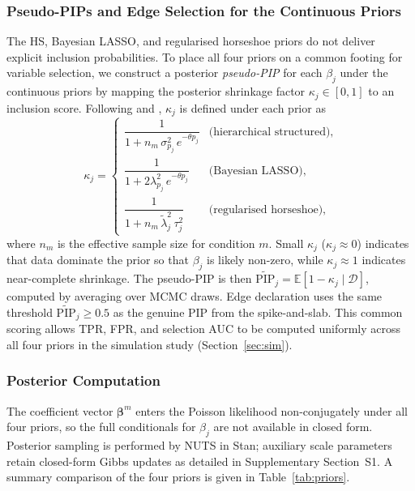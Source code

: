 \documentclass[12pt]{article}
\begin{document}
\subsubsection{Pseudo-PIPs and Edge Selection for the Continuous Priors}
\label{sec:pseudo_pip}

The HS, Bayesian LASSO, and regularised horseshoe priors do not deliver explicit inclusion probabilities. To place all four priors on a common footing for variable selection, we construct a posterior \emph{pseudo-PIP} for each $\beta_j$ under the continuous priors by mapping the posterior shrinkage factor $\kappa_j \in [0,1]$ to an inclusion score. Following \citet{carvalho2010horseshoe} and \citet{PiironenVehtari2017}, $\kappa_j$ is defined under each prior as
\[
\kappa_j = \begin{cases}
\dfrac{1}{1 + n_m\, \sigma^2_{p_j}\, e^{-\theta p_j}} & \text{(hierarchical structured),}\\[6pt]
\dfrac{1}{1 + 2\lambda^2_{p_j}\, e^{-\theta p_j}} & \text{(Bayesian LASSO),}\\[6pt]
\dfrac{1}{1 + n_m\, \tilde{\lambda}^2_j\, \tau^2_j} & \text{(regularised horseshoe),}
\end{cases}
\]
where $n_m$ is the effective sample size for condition $m$. Small $\kappa_j$ ($\kappa_j \approx 0$) indicates that data dominate the prior so that $\beta_j$ is likely non-zero, while $\kappa_j \approx 1$ indicates near-complete shrinkage. The pseudo-PIP is then $\widetilde{\mathrm{PIP}}_j = \mathbb{E}[1 - \kappa_j \mid \mathcal{D}]$, computed by averaging over MCMC draws. Edge declaration uses the same threshold $\widetilde{\mathrm{PIP}}_j \geq 0.5$ as the genuine PIP from the spike-and-slab. This common scoring allows TPR, FPR, and selection AUC to be computed uniformly across all four priors in the simulation study (Section~\ref{sec:sim}).

\subsubsection{Posterior Computation}
The coefficient vector $\boldsymbol{\beta}^m$ enters the Poisson likelihood non-conjugately under all four priors, so the full conditionals for $\beta_j$ are not available in closed form. Posterior sampling is performed by NUTS in Stan; auxiliary scale parameters retain closed-form Gibbs updates as detailed in Supplementary Section~S1. A summary comparison of the four priors is given in Table~\ref{tab:priors}.
\end{document}
